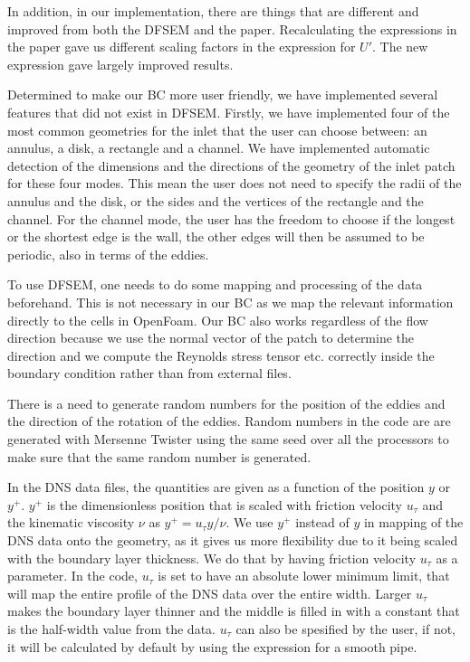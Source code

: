 \documentclass[
 amsmath,amssymb,
 aps,
]{revtex4-2}
\begin{document}
In addition, in our implementation, there are things that are different and improved from both the DFSEM and the paper. 
Recalculating the expressions in the paper gave us different scaling factors in the expression for $U'$.
The new expression gave largely improved results.

Determined to make our BC more user friendly, we have implemented several features that did not exist in DFSEM.
Firstly, we have implemented four of the most common geometries for the inlet that the user can choose between: an annulus, a disk, a rectangle and a channel.
We have implemented automatic detection of the dimensions and the directions of the geometry of the inlet patch for these four modes.
This mean the user does not need to specify the radii of the annulus and the disk, or the sides and the vertices of the rectangle and the channel.
For the channel mode, the user has the freedom to choose if the longest or the shortest edge is the wall, the other edges will then be assumed to be periodic, also in terms of the eddies. 

To use DFSEM, one needs to do some mapping and processing of the data beforehand. 
This is not necessary in our BC as we map the relevant information directly to the cells in OpenFoam.
Our BC also works regardless of the flow direction because we use the normal vector of the patch to determine the direction and we compute the Reynolds stress tensor etc. correctly inside the boundary condition rather than from external files.

There is a need to generate random numbers for the position of the eddies and the direction of the rotation of the eddies.
Random numbers in the code are are generated with Mersenne Twister using the same seed over all the processors to make sure that the same random number is generated.

In the DNS data files, the quantities are given as a function of the position $y$ or $y^+$. 
$y^+$ is the dimensionless position that is scaled with friction velocity $u_\tau$ and the kinematic viscosity $\nu$ as $y^+ = u_\tau y /\nu$.
We use $y^+$ instead of $y$ in mapping of the DNS data onto the geometry, as it gives us more flexibility due to it being scaled with the boundary layer thickness.
We do that by having friction velocity $u_\tau$ as a parameter.
In the code, $u_\tau$ is set to have an absolute lower minimum limit, that will map the entire profile of the DNS data over the entire width.
Larger $u_\tau$ makes the boundary layer thinner and the middle is filled in with a constant that is the half-width value from the data.
$u_\tau$ can also be spesified by the user, if not, it will be calculated by default by using the expression for a smooth pipe.
\end{document}
